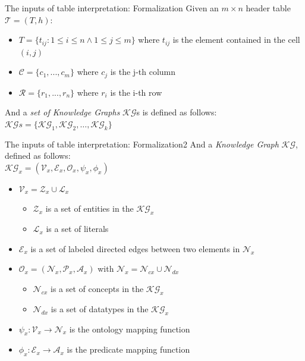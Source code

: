 \documentclass{beamer}
\begin{document}
\begin{frame}{The inputs of table interpretation: Formalization}
	Given an $m\times n$ header table $\mathcal{T} =(T, h)$:
	\begin{itemize}
		\item $T = \{t_{ij}: 1\leq i \leq n \land  1\leq j \leq m\}$ where $t_{ij}$ is the element contained in the cell $(i, j)$
		\item $\mathcal{C} = \{c_1,...,c_m\}$ where $c_j$ is the j-th column
		\item $\mathcal{R} = \{r_1,...,r_n\}$ where $r_i$ is the i-th row
	\end{itemize}
	And a \textit{set of Knowledge Graphs} $\mathcal{KG}$s is defined as follows:\\
	$\mathcal{KG}s = \{\mathcal{KG}_1,\mathcal{KG}_2,\ldots,\mathcal{KG}_k\}$\\

\end{frame}


\begin{frame}{The inputs of table interpretation: Formalization2}
	And a \textit{Knowledge Graph} $\mathcal{KG}$, defined as follows:\\
	$\mathcal{KG}_x=(\mathcal{V}_x, \mathcal{E}_x, \mathcal{O}_x, \psi_x, \phi_x)$
	\begin{itemize}
		\item $\mathcal{V}_x =\mathcal{Z}_x\cup\mathcal{L}_x $
		      \begin{itemize}
			      \item $\mathcal{Z}_x$ is a set of entities in the $\mathcal{KG}_x$
			      \item $\mathcal{L}_x$ is a set of literals
		      \end{itemize}
		\item $\mathcal{E}_x$ is a set of labeled directed edges between two elements in $\mathcal{N}_x$
		\item $\mathcal{O}_x =(\mathcal{N}_x,\mathcal{P}_x, \mathcal{A}_x)$ with $\mathcal{N}_x = \mathcal{N}_{cx} \cup \mathcal{N}_{dx}$
		      \begin{itemize}
			      \item $\mathcal{N}_{cx}$ is a set of concepts in the $\mathcal{KG}_x$
			      \item $\mathcal{N}_{dx}$ is a set of datatypes in the $\mathcal{KG}_x$
		      \end{itemize}
		\item $\psi_x: \mathcal{V}_x\to \mathcal{N}_x$ is the ontology mapping function
		\item $\phi_x: \mathcal{E}_x\to\mathcal{A}_x$ is the predicate mapping function
	\end{itemize}
\end{frame}
\end{document}
